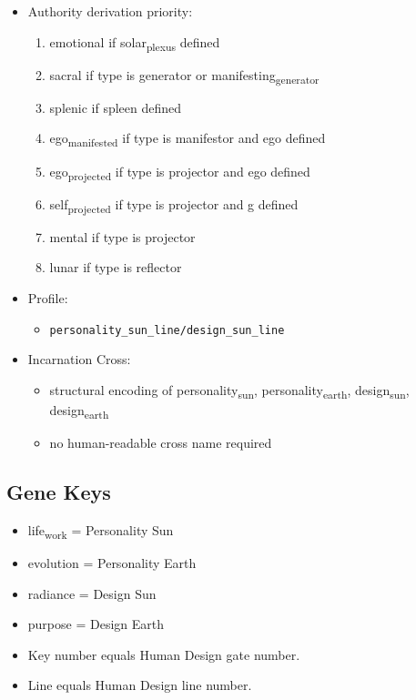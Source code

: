 \documentclass[11pt]{article}
\begin{document}
\begin{itemize}
\begin{itemize}
\item projector otherwise
\end{itemize}
\item Authority derivation priority:
\begin{enumerate}
\item emotional if solar\textsubscript{plexus} defined
\item sacral if type is generator or manifesting\textsubscript{generator}
\item splenic if spleen defined
\item ego\textsubscript{manifested} if type is manifestor and ego defined
\item ego\textsubscript{projected} if type is projector and ego defined
\item self\textsubscript{projected} if type is projector and g defined
\item mental if type is projector
\item lunar if type is reflector
\end{enumerate}
\item Profile:
\begin{itemize}
\item \texttt{personality\_sun\_line/design\_sun\_line}
\end{itemize}
\item Incarnation Cross:
\begin{itemize}
\item structural encoding of personality\textsubscript{sun}, personality\textsubscript{earth}, design\textsubscript{sun}, design\textsubscript{earth}
\item no human-readable cross name required
\end{itemize}
\end{itemize}
\subsection{Gene Keys}
\label{sec:org46ba7cc}
\begin{itemize}
\item life\textsubscript{work} = Personality Sun
\item evolution = Personality Earth
\item radiance = Design Sun
\item purpose = Design Earth
\item Key number equals Human Design gate number.
\item Line equals Human Design line number.
\end{itemize}
\end{document}
